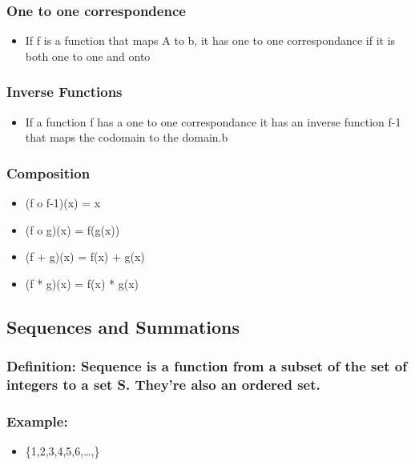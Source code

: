 \documentclass[11pt]{article}
\begin{document}
\subsubsection{One to one correspondence}
\label{sec-2-3-5}
\begin{itemize}

\item If f is a function that maps A to b, it has one to one correspondance if it is both one to one and onto
\label{sec-2-3-5-1}%
\end{itemize} %
\subsubsection{Inverse Functions}
\label{sec-2-3-6}
\begin{itemize}

\item If a function f has a one to one correspondance it has an inverse function f-1 that maps the codomain to the domain.b
\label{sec-2-3-6-1}%
\end{itemize} %
\subsubsection{Composition}
\label{sec-2-3-7}
\begin{itemize}

\item (f o f-1)(x) = x
\label{sec-2-3-7-1}%

\item (f o g)(x) = f(g(x))
\label{sec-2-3-7-2}%

\item (f + g)(x) = f(x) + g(x)
\label{sec-2-3-7-3}%

\item (f * g)(x) = f(x) * g(x)
\label{sec-2-3-7-4}%
\end{itemize} %
\subsection{Sequences and Summations}
\label{sec-2-4}
\subsubsection{Definition: Sequence is a function from a subset of the set of integers to a set S. They're also an ordered set.}
\label{sec-2-4-1}
\subsubsection{Example:}
\label{sec-2-4-2}
\begin{itemize}

\item \{1,2,3,4,5,6,\ldots{},\}
\label{sec-2-4-2-1}%
\end{itemize} %
\end{document}

